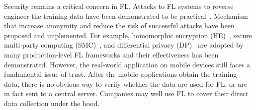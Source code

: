 \documentclass[conference]{IEEEtran}
\begin{document}
Security remains a critical concern in FL.
Attacks to FL systems to reverse engineer the training data have been
demonstrated to be practical~\cite{sun2019really}.
Mechanism that increase anonymity and
reduce the risk of successful attacks have been proposed and implemented.
For example,
homomorphic encryption (HE)~\cite{wang2020homo},
secure multi-party computing (SMC)~\cite{bonawitz2016practical}, and
differential privacy
(DP)~\cite{dwork2006differential,geyer2017differentially} are
adopted by many production-level FL frameworks and
their effectiveness has been demonstrated.
However, the real-world application on mobile devices still faces a fundamental
issue of trust.
After the mobile applications obtain the training data,
there is no obvious way to verify whether the data are used for FL,
or are in fact sent to a central server.
Companies may well use FL to cover their direct data collection under the hood.

\printbibliography

\end{document}
